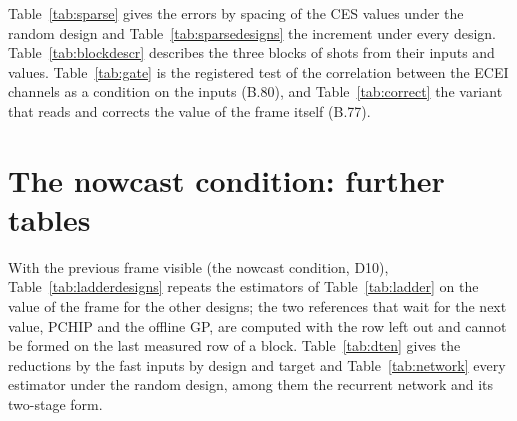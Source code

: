 \documentclass[11pt,a4paper]{article}
\begin{document}
Table~\ref{tab:sparse} gives the errors by spacing of the CES values under the random
design and Table~\ref{tab:sparsedesigns} the increment under every design.
Table~\ref{tab:blockdescr} describes the three blocks of shots from their inputs and
values. Table~\ref{tab:gate} is the registered test of the correlation between the
ECEI channels as a condition on the inputs (B.80), and
Table~\ref{tab:correct} the variant that reads and corrects the value of the frame itself
(B.77).

\begin{table}[tbp]
  \centering
  \caption{\CapSparse}
  \label{tab:sparse}
  \TabSparse
\end{table}

\begin{table}[tbp]
  \centering
  \caption{\CapBlockDescr}
  \label{tab:blockdescr}
  \TabBlockDescr
\end{table}

\begin{table}[tbp]
  \centering
  \caption{\CapSparseDesigns}
  \label{tab:sparsedesigns}
  \TabSparseDesigns
\end{table}

\begin{table}[tbp]
  \centering
  \caption{\CapGate}
  \label{tab:gate}
  \TabGate
\end{table}

\begin{table}[tbp]
  \centering
  \caption{\CapCorrect}
  \label{tab:correct}
  \TabCorrect
\end{table}

\section{The nowcast condition: further tables}
\label{sec:sprev}

With the previous frame visible (the nowcast condition, D10), Table~\ref{tab:ladderdesigns}
repeats the estimators of Table~\ref{tab:ladder} on the value of the frame for the other
designs; the two references that wait for the next value, PCHIP and the offline GP, are
computed with the row left out and cannot be formed on the last measured row of a block.
Table~\ref{tab:dten} gives the reductions by the fast inputs by design and target and
Table~\ref{tab:network} every estimator under the random design, among them the recurrent
network and its two-stage form.
\end{document}
